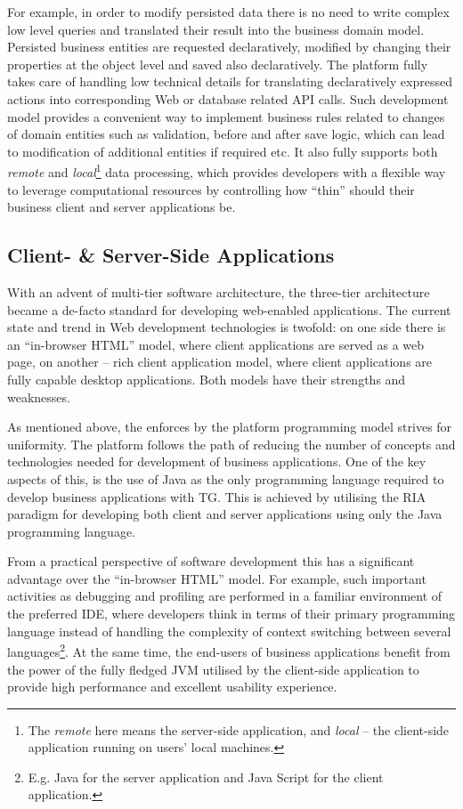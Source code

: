   For example, in order to modify persisted data there is no need to write complex low level queries and translated their result into the business domain model.
  Persisted business entities are requested declaratively, modified by changing their properties at the object level and saved also declaratively.
  The platform fully takes care of handling low technical details for translating declaratively expressed actions into corresponding Web or database related API calls.
  Such development model provides a convenient way to implement business rules related to changes of domain entities such as validation, before and after save logic, which can lead to modification of additional entities if required etc.
  It also fully supports both \emph{remote} and \emph{local}\footnote{The \emph{remote} here means the server-side application, and \emph{local} -- the client-side application running on users' local machines.} data processing, which provides developers with a flexible way to leverage computational resources by controlling how ``thin'' should their business client and server applications be.

  \subsection{Client- \& Server-Side Applications}
  With an advent of multi-tier software architecture, the three-tier architecture became a de-facto standard for developing web-enabled applications.
  The current state and trend in Web development technologies is twofold: on one side there is an ``in-browser HTML'' model, where client applications are served as a web page, on another -- rich client application model, where client applications are fully capable desktop applications.
  Both models have their strengths and weaknesses.

  As mentioned above, the enforces by the platform programming model strives for uniformity. 
  The platform follows the path of reducing the number of concepts and technologies needed for development of business applications.
  One of the key aspects of this, is the use of Java as the only programming language required to develop business applications with TG.
  This is achieved by utilising the RIA paradigm for developing both client and server applications using only the Java programming language.
  
  From a practical perspective of software development this has a significant advantage over the ``in-browser HTML'' model.  
  For example, such important activities as debugging and profiling are performed in a familiar environment of the preferred IDE, where developers think in terms of their primary programming language instead of handling the complexity of context switching between several languages\footnote{E.g. Java for the server application and Java Script for the client application.}.
  At the same time, the end-users of business applications benefit from the power of the fully fledged JVM utilised by the client-side application to provide high performance and excellent usability experience.
  

